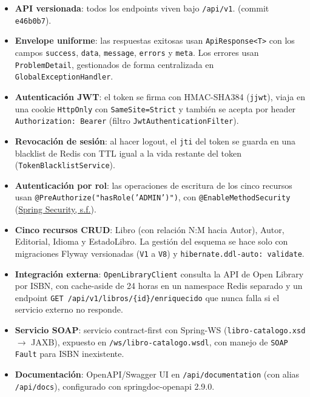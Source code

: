 \documentclass[12pt,a4paper]{article}
\begin{document}
\begin{itemize}[leftmargin=1.2cm]
  \item \textbf{API versionada}: todos los endpoints viven bajo \texttt{/api/v1}.
        (commit \texttt{e46b0b7}).
  \item \textbf{Envelope uniforme}: las respuestas exitosas usan
        \texttt{ApiResponse<T>} con los campos \texttt{success}, \texttt{data},
        \texttt{message}, \texttt{errors} y \texttt{meta}. Los errores usan
        \texttt{ProblemDetail}, gestionados de forma centralizada en
        \texttt{GlobalExceptionHandler}.
  \item \textbf{Autenticación JWT}: el token se firma con HMAC-SHA384 (\texttt{jjwt}),
        viaja en una cookie \texttt{HttpOnly} con \texttt{SameSite=Strict} y también se
        acepta por header \texttt{Authorization: Bearer} (filtro
        \texttt{JwtAuthenticationFilter}).
  \item \textbf{Revocación de sesión}: al hacer logout, el \texttt{jti} del token se
        guarda en una blacklist de Redis con TTL igual a la vida restante del token
        (\texttt{TokenBlacklistService}).
  \item \textbf{Autenticación por rol}: las operaciones de escritura de los cinco
        recursos usan \texttt{@PreAuthorize("hasRole('ADMIN')")}, con
        \texttt{@EnableMethodSecurity} (\hyperlink{ref:springsecurity}{Spring Security, s.f.}).
  \item \textbf{Cinco recursos CRUD}: Libro (con relación N:M hacia Autor), Autor,
        Editorial, Idioma y EstadoLibro. La gestión del esquema se hace solo con
        migraciones Flyway versionadas (\texttt{V1} a \texttt{V8}) y
        \texttt{hibernate.ddl-auto: validate}.
  \item \textbf{Integración externa}: \texttt{OpenLibraryClient} consulta la API de
        Open Library por ISBN, con cache-aside de 24 horas en un namespace Redis
        separado y un endpoint \texttt{GET /api/v1/libros/\{id\}/enriquecido} que nunca
        falla si el servicio externo no responde.
  \item \textbf{Servicio SOAP}: servicio contract-first con Spring-WS
        (\texttt{libro-catalogo.xsd} $\rightarrow$ JAXB), expuesto en
        \texttt{/ws/libro-catalogo.wsdl}, con manejo de \texttt{SOAP Fault} para ISBN
        inexistente.
  \item \textbf{Documentación}: OpenAPI/Swagger UI en \texttt{/api/documentation}
        (con alias \texttt{/api/docs}), configurado con springdoc-openapi 2.9.0.
\end{itemize}
\end{document}
